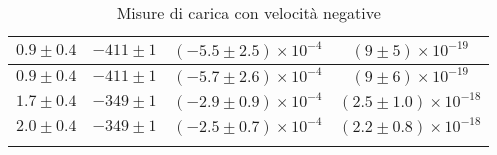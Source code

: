\begin{longtable}[C]{|c|c|c|c|}
            \hline
            $0.9 \pm 0.4$ & $-411 \pm 1$ & $(-5.5 \pm 2.5) \times 10^{-4}$ & $(9 \pm 5) \times 10^{-19}$ \\
            \hline
            $0.9 \pm 0.4$ & $-411 \pm 1$ & $(-5.7 \pm 2.6) \times 10^{-4}$ & $(9 \pm 6) \times 10^{-19}$ \\
            \hline
            $1.7 \pm 0.4$ & $-349 \pm 1$ & $(-2.9 \pm 0.9) \times 10^{-4}$ & $(2.5 \pm 1.0) \times 10^{-18}$ \\
            \hline
            $2.0 \pm 0.4$ & $-349 \pm 1$ & $(-2.5 \pm 0.7) \times 10^{-4}$ & $(2.2 \pm 0.8) \times 10^{-18}$ \\
            \hline
            \caption{Misure di carica con velocità negative}
        \end{longtable}

